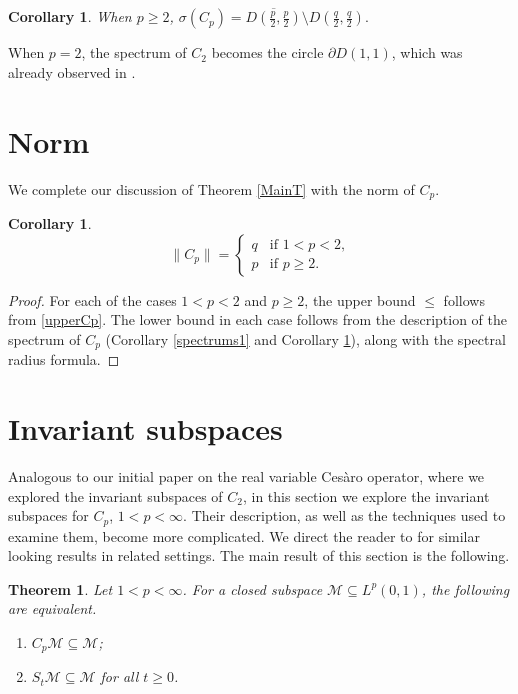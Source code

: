 \documentclass[11pt]{amsart}
\numberwithin{equation}{section}
\theoremstyle{plain}
\newtheorem{Corollary}[equation]{Corollary}
\newtheorem{Theorem}[equation]{Theorem}
\theoremstyle{definition}
\renewcommand{\leq}{\leqslant}
\renewcommand{\geq}{\geqslant}
\renewcommand{\subset}{\subseteq}
\newcommand{\0}{{\color{lightgray}0}}
\begin{document}
\begin{Corollary}\label{specrsusms2}
When $p \geq 2$, $\sigma(C_p) = \overline{D(\tfrac{p}{2}, \tfrac{p}{2})} \setminus D(\tfrac{q}{2}, \tfrac{q}{2}).$
\end{Corollary}

When $p = 2$, the spectrum of $C_2$ becomes the circle $\partial D(1, 1)$, which was already observed in \cite{CL2}. 

\section{Norm}

We complete our discussion of Theorem \ref{MainT} with the norm of $C_p$.

\begin{Corollary}\label{finallla}
$$\|C_{p}\| = \begin{cases}
q & \mbox{if $1 < p < 2$,}\\
p & \mbox{if $p \geq 2$.}
\end{cases}$$
\end{Corollary}

\begin{proof}
For each of the cases $1 < p < 2$ and $p \geq 2$, the upper bound $\leq$ follows from \eqref{upperCp}. The lower bound in each case follows from the description of the spectrum of $C_p$ (Corollary \ref{spectrums1} and Corollary \ref{specrsusms2}), along with the spectral radius formula. 
\end{proof}

\section{Invariant subspaces}\label{IJnvariant}

Analogous to our initial paper \cite{CL2} on the real variable Ces\`{a}ro operator, where we explored the invariant subspaces of $C_2$, in this section we explore the invariant subspaces for $C_p$, $1 < p < \infty$. Their description, as well as the techniques used to examine them, become more complicated. We direct the reader to \cite{GPRH, GPR} for similar looking results in related settings. The main result of this section is the following. 


\begin{Theorem}\label{invariant s7s}
Let $1 < p < \infty$. For a  closed subspace $\mathcal{M} \subset L^p(0, 1)$, the following are equivalent. 
\begin{enumerate}
\item $C_p \mathcal{M} \subset \mathcal{M}$;
\item $S_{t} \mathcal{M} \subset \mathcal{M}$ for all $t \geq 0$.
\end{enumerate}
\end{Theorem}
\end{document}
